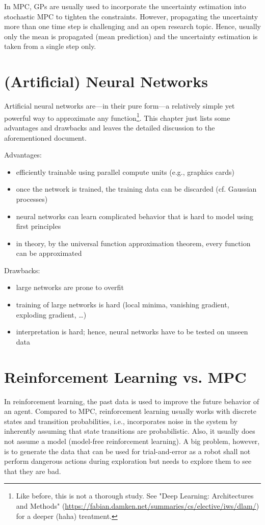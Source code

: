 			In MPC, GPs are usually used to incorporate the uncertainty estimation into stochastic MPC to tighten the constraints. However, propagating the uncertainty more than one time step is challenging and an open research topic. Hence, usually only the mean is propagated (mean prediction) and the uncertainty estimation is taken from a single step only.

	\section{(Artificial) Neural Networks}
		Artificial neural networks are---in their pure form---a relatively simple yet powerful way to approximate any function\footnote{Like before, this is not a thorough study. See "Deep Learning: Architectures and Methods" (\url{https://fabian.damken.net/summaries/cs/elective/iws/dlam/}) for a deeper (haha) treatment.}. This chapter just lists some advantages and drawbacks and leaves the detailed discussion to the aforementioned document.

		Advantages:
		\begin{itemize}
			\item efficiently trainable using parallel compute units (e.g., graphics cards)
			\item once the network is trained, the training data can be discarded (cf. Gaussian processes)
			\item neural networks can learn complicated behavior that is hard to model using first principles
			\item in theory, by the universal function approximation theorem, every function can be approximated
		\end{itemize}
		Drawbacks:
		\begin{itemize}
			\item large networks are prone to overfit
			\item training of large networks is hard (local minima, vanishing gradient, exploding gradient, \dots)
			\item interpretation is hard; hence, neural networks have to be tested on unseen data
		\end{itemize}

	\section{Reinforcement Learning vs. MPC}
		In reinforcement learning, the past data is used to improve the future behavior of an agent. Compared to MPC, reinforcement learning usually works with discrete states and transition probabilities, i.e., incorporates noise in the system by inherently assuming that state transitions are probabilistic. Also, it usually does not assume a model (model-free reinforcement learning). A big problem, however, is to generate the data that can be used for trial-and-error as a robot shall not perform dangerous actions during exploration but needs to explore them to see that they are bad.

